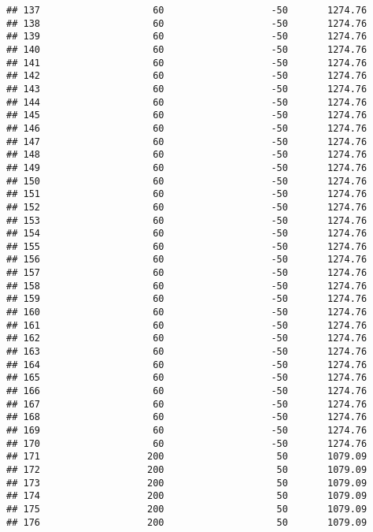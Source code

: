 \documentclass[]{article}
\begin{document}
\begin{verbatim}
## 137                    60                   -50       1274.76
## 138                    60                   -50       1274.76
## 139                    60                   -50       1274.76
## 140                    60                   -50       1274.76
## 141                    60                   -50       1274.76
## 142                    60                   -50       1274.76
## 143                    60                   -50       1274.76
## 144                    60                   -50       1274.76
## 145                    60                   -50       1274.76
## 146                    60                   -50       1274.76
## 147                    60                   -50       1274.76
## 148                    60                   -50       1274.76
## 149                    60                   -50       1274.76
## 150                    60                   -50       1274.76
## 151                    60                   -50       1274.76
## 152                    60                   -50       1274.76
## 153                    60                   -50       1274.76
## 154                    60                   -50       1274.76
## 155                    60                   -50       1274.76
## 156                    60                   -50       1274.76
## 157                    60                   -50       1274.76
## 158                    60                   -50       1274.76
## 159                    60                   -50       1274.76
## 160                    60                   -50       1274.76
## 161                    60                   -50       1274.76
## 162                    60                   -50       1274.76
## 163                    60                   -50       1274.76
## 164                    60                   -50       1274.76
## 165                    60                   -50       1274.76
## 166                    60                   -50       1274.76
## 167                    60                   -50       1274.76
## 168                    60                   -50       1274.76
## 169                    60                   -50       1274.76
## 170                    60                   -50       1274.76
## 171                   200                    50       1079.09
## 172                   200                    50       1079.09
## 173                   200                    50       1079.09
## 174                   200                    50       1079.09
## 175                   200                    50       1079.09
## 176                   200                    50       1079.09

\end{verbatim}
\end{document}
